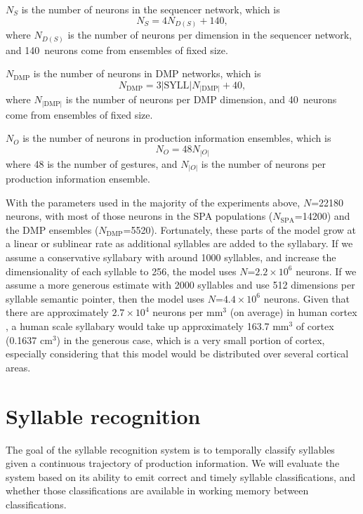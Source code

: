 $N_S$ is the number of neurons
in the sequencer network,
which is
\begin{equation*}
  N_S = 4 N_{D(S)} + 140,
\end{equation*}
where $N_{D(S)}$ is the number of neurons
per dimension in the sequencer network,
and 140~neurons come from ensembles
of fixed size.

$N_{\text{DMP}}$ is the number of neurons
in DMP networks, which is
\begin{equation*}
  N_{\text{DMP}} = 3 |\text{SYLL}| N_{|\text{DMP}|} + 40,
\end{equation*}
where $N_{|\text{DMP}|}$ is the number of neurons
per DMP dimension,
and 40~neurons come from ensembles of fixed size.

$N_O$ is the number of neurons
in production information ensembles, which is
\begin{equation*}
  N_O = 48 N_{|O|}
\end{equation*}
where 48 is the number of gestures,
and $N_{|O|}$ is the number of neurons
per production information ensemble.

With the parameters used
in the majority of the experiments above,
$N$=22180 neurons,
with most of those neurons
in the SPA populations
($N_{\text{SPA}}$=14200)
and the DMP ensembles ($N_{\text{DMP}}$=5520).
Fortunately, these parts of the model
grow at a linear or sublinear rate
as additional syllables are added
to the syllabary.
If we assume a conservative syllabary
with around 1000 syllables,
and increase the dimensionality
of each syllable to 256,
the model uses
$N$=$2.2 \times 10^6$ neurons.
If we assume a more generous estimate
with 2000 syllables
and use 512 dimensions
per syllable semantic pointer,
then the model uses
$N$=$4.4 \times 10^6$ neurons.
Given that there are approximately
$2.7 \times 10^4$ neurons per mm$^3$ (on average)
in human cortex \citep[BNID 112050]{milo2010},
a human scale syllabary would take up
approximately 163.7 mm$^3$ of cortex
(0.1637 cm$^3$)
in the generous case,
which is a very small portion of cortex,
especially considering that this model
would be distributed over
several cortical areas.

\section{Syllable recognition}

The goal of the syllable recognition system
is to temporally classify syllables
given a continuous trajectory
of production information.
We will evaluate the system
based on its ability to emit
correct and timely syllable classifications,
and whether those classifications
are available in working memory
between classifications.

